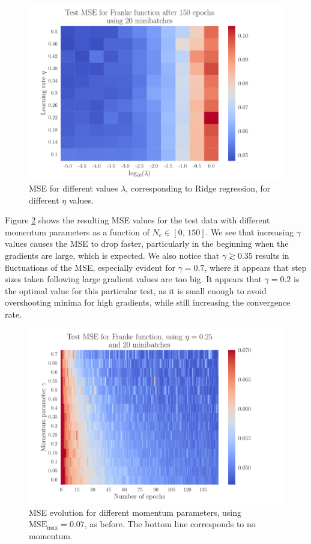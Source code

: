 \documentclass[12pt]{extarticle}
\begin{document}
\begin{figure}[h!]
	\includegraphics[width=0.9\linewidth]{SGD_Franke/reg_Franke__lambda_eta__Test_MSE__764274.pdf}
	\caption{MSE for different values $\lambda$, corresponding to Ridge regression, for different $\eta$ values.}
	\label{fig:SGD_Franke_lambda_eta}
\end{figure}


Figure \ref{fig:SGD_Franke_epochs_gamma} shows the resulting MSE values for the test data with different momentum parameters as a function of $N_e\in[0,\,150]$. We see that increasing $\gamma$ values causes the MSE to drop faster, particularly in the beginning when the gradients are large, which is expected. We also notice that $\gamma\gtrsim0.35$ results in fluctuations of the MSE, especially evident for $\gamma=0.7$, where it appears that step sizes taken following large gradient values are too big. It appears that $\gamma=0.2$ is the optimal value for this particular test, as it is small enough to avoid overshooting minima for high gradients, while still increasing the convergence rate.

\begin{figure}[h!]
	\includegraphics[width=0.9\linewidth]{SGD_Franke/reg_Franke__epochs_gamma__Test_MSE__239373.pdf}
	\caption{MSE evolution for different momentum parameters, using $\mathrm{MSE}_\mathrm{max}=0.07$, as before. The bottom line corresponds to no momentum.}
	\label{fig:SGD_Franke_epochs_gamma}
\end{figure}
\end{document}
